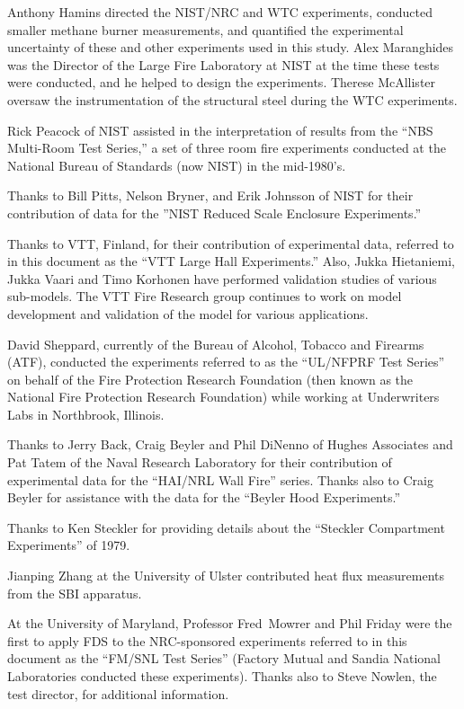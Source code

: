 \documentclass[11pt]{book}
\begin{document}
Anthony Hamins directed the NIST/NRC and WTC experiments, conducted smaller methane burner
measurements, and quantified the experimental uncertainty of these and other
experiments used in this study. Alex Maranghides was the Director of the Large Fire Laboratory at NIST at
the time these tests were conducted, and he helped to design the
experiments. Therese McAllister oversaw the instrumentation of the structural steel during the WTC experiments.

Rick Peacock of NIST assisted in the interpretation of results from
the ``NBS Multi-Room Test Series,'' a set of three room
fire experiments conducted at the National Bureau of Standards (now
NIST) in the mid-1980's.

Thanks to Bill Pitts, Nelson Bryner, and Erik Johnsson of NIST for their contribution of data for the
''NIST Reduced Scale Enclosure Experiments.''

Thanks to VTT, Finland, for their contribution of experimental data,
referred to in this document as the ``VTT Large Hall Experiments.''
Also, Jukka Hietaniemi, Jukka Vaari and Timo Korhonen have
performed validation studies of various sub-models. The VTT Fire
Research group continues to work on model development and
validation of the model for various applications.

David Sheppard, currently of the Bureau of Alcohol, Tobacco and Firearms (ATF), conducted the
experiments referred to as the ``UL/NFPRF Test Series'' on behalf of the Fire Protection Research Foundation (then known as
the National Fire Protection Research Foundation) while working at Underwriters Labs in Northbrook, Illinois.

Thanks to Jerry Back, Craig Beyler and Phil DiNenno of Hughes Associates and Pat Tatem of
the Naval Research Laboratory for their contribution
of experimental data for the ``HAI/NRL Wall Fire'' series. Thanks also to Craig Beyler for assistance with the data
for the ``Beyler Hood Experiments.''

Thanks to Ken Steckler for providing details about the ``Steckler Compartment Experiments'' of 1979.

Jianping Zhang at the University of Ulster contributed heat flux measurements from the SBI apparatus.

At the University of Maryland, Professor Fred~Mowrer and Phil Friday
were the first to apply FDS to the NRC-sponsored experiments referred
to in this document as the ``FM/SNL Test Series'' (Factory Mutual and
Sandia National Laboratories conducted these experiments). Thanks also to
Steve Nowlen, the test director, for additional information.
\end{document}
